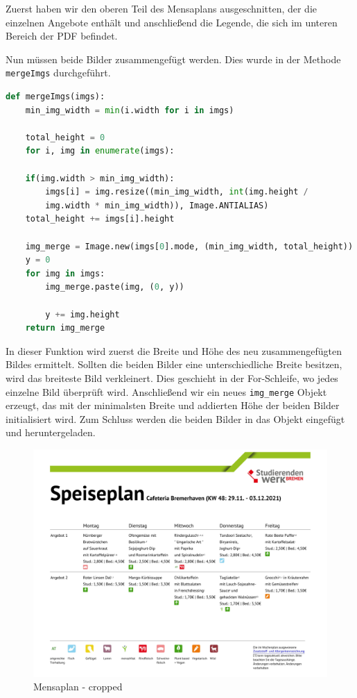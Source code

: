 Zuerst haben wir den oberen Teil des Mensaplans ausgeschnitten, der die einzelnen Angebote enthält und anschließend die Legende, die sich im unteren Bereich der PDF befindet. 

Nun müssen beide Bilder zusammengefügt werden. Dies wurde in der Methode \verb|mergeImgs| durchgeführt.\\


\begin{lstlisting}[language=Python]
def mergeImgs(imgs):
    min_img_width = min(i.width for i in imgs)
    
    total_height = 0
    for i, img in enumerate(imgs):
    
    if(img.width > min_img_width):
        imgs[i] = img.resize((min_img_width, int(img.height / 
        img.width * min_img_width)), Image.ANTIALIAS)
    total_height += imgs[i].height
    
    img_merge = Image.new(imgs[0].mode, (min_img_width, total_height))
    y = 0
    for img in imgs:
        img_merge.paste(img, (0, y))
    
        y += img.height
    return img_merge
\end{lstlisting}

In dieser Funktion wird zuerst die Breite und Höhe des neu zusammengefügten Bildes ermittelt. Sollten die beiden Bilder eine unterschiedliche Breite besitzen, wird das breiteste Bild verkleinert. Dies geschieht in der For-Schleife, wo jedes einzelne Bild überprüft wird. 
Anschließend wir ein neues \verb|img_merge| Objekt erzeugt, das mit der minimalsten Breite und addierten Höhe der beiden Bilder initialisiert wird. Zum Schluss werden die beiden Bilder in das Objekt eingefügt und heruntergeladen.

\begin{figure}[H]
    \centering
    \includegraphics[width=15cm]{Figures/AppChapter/mensa_3.png}
    \caption{Mensaplan - cropped}
    \label{fig:Mensaplan}
    \centering
\end{figure}


